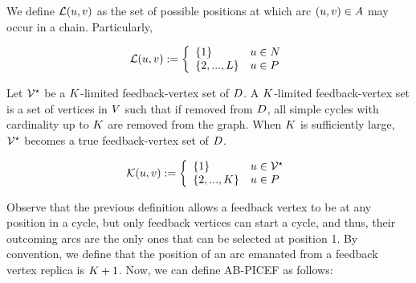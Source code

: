 \documentclass{article}
\begin{document}
	We define $\mathcal{L}(u,v)$ as the set of possible positions at which arc $(u,v) \in A$ may occur in a chain. Particularly,
	
	$$
	\mathcal{L}(u,v) := \left\{
	\begin{array}{ll}
		\{1\}      & u \in N \\
		\{2,...,L\}      & u \in P
	\end{array}
	\right.
	$$
	
Let $\mathcal{V}^{\star}$	be a $K$-limited feedback-vertex set of $D$. A $K$-limited feedback-vertex set is a set of vertices in $V$ such that if removed from $D$, all simple cycles with cardinality up to $K$ are removed from the graph. When $K$ is sufficiently large, $\mathcal{V}^{\star}$ becomes a true feedback-vertex set of $D$. 

	$$
\mathcal{K}(u,v) := \left\{
\begin{array}{ll}
	\{1\}      & u \in \mathcal{V}^{\star} \\
	\{2,...,K\}      & u \in P
\end{array}
\right.
$$

Observe that the previous definition allows a feedback vertex to be at any position in a cycle, but only feedback vertices can start a cycle, and thus, their outcoming arcs are the only ones that can be selected at position 1. By convention, we define that the position of an arc emanated from a feedback vertex replica is $K + 1$. Now, we can define AB-PICEF as follows:

\end{document}
